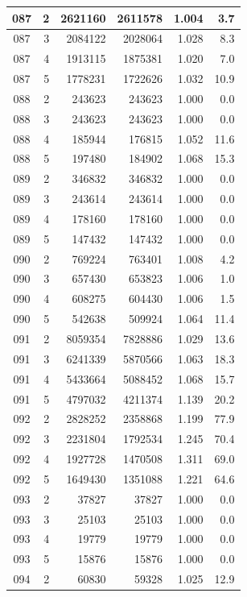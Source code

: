 \begin{longtable}{|c|r|r|r|r|r|}
\hline
087 & 2 & 2621160 & 2611578 & 1.004 & 3.7 \\
\hline
087 & 3 & 2084122 & 2028064 & 1.028 & 8.3 \\
\hline
087 & 4 & 1913115 & 1875381 & 1.020 & 7.0 \\
\hline
087 & 5 & 1778231 & 1722626 & 1.032 & 10.9 \\
\hline
088 & 2 & 243623 & 243623 & 1.000 & 0.0 \\
\hline
088 & 3 & 243623 & 243623 & 1.000 & 0.0 \\
\hline
088 & 4 & 185944 & 176815 & 1.052 & 11.6 \\
\hline
088 & 5 & 197480 & 184902 & 1.068 & 15.3 \\
\hline
089 & 2 & 346832 & 346832 & 1.000 & 0.0 \\
\hline
089 & 3 & 243614 & 243614 & 1.000 & 0.0 \\
\hline
089 & 4 & 178160 & 178160 & 1.000 & 0.0 \\
\hline
089 & 5 & 147432 & 147432 & 1.000 & 0.0 \\
\hline
090 & 2 & 769224 & 763401 & 1.008 & 4.2 \\
\hline
090 & 3 & 657430 & 653823 & 1.006 & 1.0 \\
\hline
090 & 4 & 608275 & 604430 & 1.006 & 1.5 \\
\hline
090 & 5 & 542638 & 509924 & 1.064 & 11.4 \\
\hline
091 & 2 & 8059354 & 7828886 & 1.029 & 13.6 \\
\hline
091 & 3 & 6241339 & 5870566 & 1.063 & 18.3 \\
\hline
091 & 4 & 5433664 & 5088452 & 1.068 & 15.7 \\
\hline
091 & 5 & 4797032 & 4211374 & 1.139 & 20.2 \\
\hline
092 & 2 & 2828252 & 2358868 & 1.199 & 77.9 \\
\hline
092 & 3 & 2231804 & 1792534 & 1.245 & 70.4 \\
\hline
092 & 4 & 1927728 & 1470508 & 1.311 & 69.0 \\
\hline
092 & 5 & 1649430 & 1351088 & 1.221 & 64.6 \\
\hline
093 & 2 & 37827 & 37827 & 1.000 & 0.0 \\
\hline
093 & 3 & 25103 & 25103 & 1.000 & 0.0 \\
\hline
093 & 4 & 19779 & 19779 & 1.000 & 0.0 \\
\hline
093 & 5 & 15876 & 15876 & 1.000 & 0.0 \\
\hline
094 & 2 & 60830 & 59328 & 1.025 & 12.9 \\

\end{longtable}
